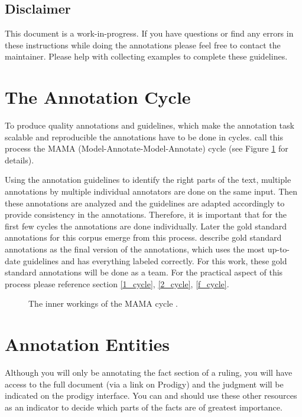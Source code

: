 \documentclass{article}
\begin{document}
\subsection{Disclaimer}
This document is a work-in-progress. If you have questions or find any errors in these instructions while doing the annotations please feel free to contact the maintainer. Please help with collecting examples to complete these guidelines.

\section{The Annotation Cycle}
To produce quality annotations and guidelines, which make the annotation task scalable and reproducible the annotations have to be done in cycles. \cite{pustejovsky2012natural} call this process the MAMA (Model-Annotate-Model-Annotate) cycle (see Figure \ref{MAMA_cycle} for details). 

Using the annotation guidelines to identify the right parts of the text, multiple annotations by multiple individual annotators are done on the same input. Then these annotations are analyzed and the guidelines are adapted accordingly to provide consistency in the annotations. Therefore, it is important that for the first few cycles the annotations are done individually. Later the gold standard annotations for this corpus emerge from this process. \cite{pustejovsky2012natural} describe gold standard annotations as the final version of the annotations, which uses the most up-to-date guidelines and has everything labeled correctly. For this work, these gold standard annotations will be done as a team. For the practical aspect of this process please reference section \ref{1_cycle},  \ref{2_cycle}, \ref{f_cycle}. 

\begin{figure}[H]
     \caption{The inner workings of the MAMA cycle \citep{pustejovsky2012natural}.}
     \label{MAMA_cycle}
\end{figure}

\section{Annotation Entities}
Although you will only be annotating the fact section of a ruling, you will have access to the full document (via a link on Prodigy) and the judgment will be indicated on the prodigy interface. You can and should use these other resources as an indicator to decide which parts of the facts are of greatest importance.
\end{document}
